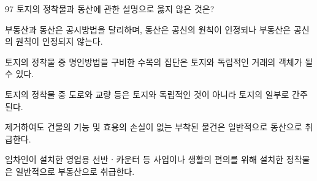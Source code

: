 \begin{question}{97}
토지의 정착물과 동산에 관한 설명으로 옳지 않은 것은?
\begin{choices}
  \item 부동산과 동산은 공시방법을 달리하며, 동산은 공신의 원칙이 인정되나 부동산은 공신의 원칙이 인정되지 않는다.
  \item 토지의 정착물 중 명인방법을 구비한 수목의 집단은 토지와 독립적인 거래의 객체가 될 수 있다.
  \item 토지의 정착물 중 도로와 교량 등은 토지와 독립적인 것이 아니라 토지의 일부로 간주된다.
  \item 제거하여도 건물의 기능 및 효용의 손실이 없는 부착된 물건은 일반적으로 동산으로 취급한다.
  \item 임차인이 설치한 영업용 선반ㆍ카운터 등 사업이나 생활의 편의를 위해 설치한 정착물은 일반적으로 부동산으로 취급한다.
\end{choices}
\end{question}
